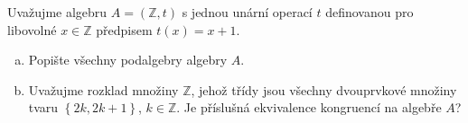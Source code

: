 \subsubsection{}
Uvažujme algebru $A=(\mathbb{Z}, t)$ s jednou unární operací $t$ definovanou pro
libovolné $x \in \mathbb{Z}$ předpisem $t(x) = x+1$.
\begin{enumerate}[a)]
  \item Popište všechny podalgebry algebry $A$.
  \item Uvažujme rozklad množiny $\mathbb{Z}$, jehož třídy jsou všechny
  dvouprvkové množiny tvaru $\left \{ 2k, 2k+1 \right \}$, $k \in \mathbb{Z}$.
  Je příslušná ekvivalence kongruencí na algebře $A$?
\end{enumerate}
